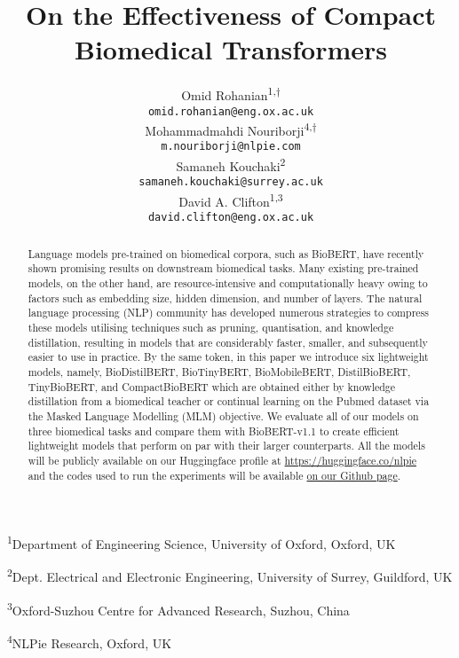 \documentclass{article}
\title{On the Effectiveness of Compact Biomedical Transformers}
\author{Omid Rohanian\textsuperscript{1,$\dagger$} \\
  \texttt{omid.rohanian@eng.ox.ac.uk} \\
\And
   Mohammadmahdi Nouriborji\textsuperscript{4,$\dagger$} \\
   \texttt{m.nouriborji@nlpie.com} \\
   \AND
   Samaneh Kouchaki\textsuperscript{2} \\
   \texttt{samaneh.kouchaki@surrey.ac.uk} \\
   \And
   David A. Clifton\textsuperscript{1,3} \\
   \texttt{david.clifton@eng.ox.ac.uk} \\
}
\begin{document}
\maketitle

\def\thefootnote{$\dagger$}
\def\thefootnote{\arabic{footnote}}

\begin{center}

\textsuperscript{1}Department of Engineering Science, University of Oxford, Oxford, UK

\textsuperscript{2}Dept. Electrical and Electronic Engineering, University of Surrey, Guildford, UK

\textsuperscript{3}Oxford-Suzhou Centre for Advanced Research, Suzhou, China

\textsuperscript{4}NLPie Research, Oxford, UK 

\end{center}

\begin{abstract}
  Language models pre-trained on biomedical corpora, such as BioBERT, have recently shown promising results on downstream biomedical tasks. Many existing pre-trained models, on the other hand, are resource-intensive and computationally heavy owing to factors such as embedding size, hidden dimension, and number of layers. The natural language processing (NLP) community has developed numerous strategies to compress these models utilising techniques such as pruning, quantisation, and knowledge distillation, resulting in models that are considerably faster, smaller, and subsequently easier to use in practice. By the same token, in this paper we introduce six lightweight models, namely, BioDistilBERT, BioTinyBERT, BioMobileBERT, DistilBioBERT, TinyBioBERT, and CompactBioBERT which are obtained either by knowledge distillation from a biomedical teacher or continual learning on the Pubmed dataset via the Masked Language Modelling (MLM) objective. We evaluate all of our models on three biomedical tasks and compare them with BioBERT-v1.1 to create efficient lightweight models that perform on par with their larger counterparts. All the models will be publicly available on our Huggingface profile at \url{https://huggingface.co/nlpie} and the codes used to run the experiments will be available \href{https://github.com/nlpie-research/Compact-Biomedical-Transformers}{on our Github page}.  

\end{abstract}
\end{document}
